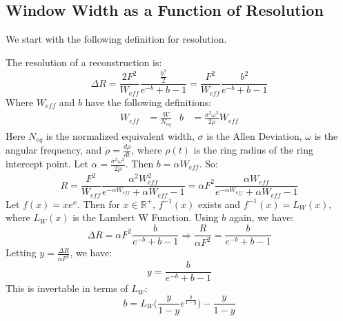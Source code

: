 \documentclass[crop=false,class=book,oneside]{standalone}
\begin{document}
        \subsection{Window Width as a Function of Resolution}
            We start with the following definition for resolution.
            \begin{definition}
            The resolution of a reconstruction is:
            \begin{equation*}
                \Delta R=\frac{2F^{2}}{W_{eff}}\frac{\frac{b^2}{2}}{e^{-b}+b-1}=\frac{F^{2}}{W_{eff}}\frac{b^2}{e^{-b}+b-1}
            \end{equation*}
            Where $W_{eff}$ and $b$ have the following definitions:
            \begin{align*}
                W_{eff}&=\frac{W}{N_{eq}}&b&=\frac{\sigma^2\omega^2}{2\dot{\rho}}W_{eff}
            \end{align*}
            Here $N_{eq}$ is the normalized equivalent width, $\sigma$ is the Allen Deviation, $\omega$ is the angular frequency, and $\dot{\rho}=\frac{d\rho}{dt}$, where $\rho(t)$ is the ring radius of the ring intercept point. Let $\alpha = \frac{\sigma^2 \omega^2}{2\dot{\rho}}$. Then $b = \alpha W_{eff}$. So:
            \begin{equation*}
            R = \frac{F^2}{W_{eff}}\frac{\alpha^2 W_{eff}^2}{e^{-\alpha W_{eff}}+\alpha W_{eff}-1} = \alpha F^2 \frac{\alpha W_{eff}}{e^{-\alpha W_{eff}}+\alpha W_{eff} - 1}
            \end{equation*}
            Let $f(x) = xe^{x}$. Then for $x\in \mathbb{R}^{+}$, $f^{-1}(x)$ exists and $f^{-1}(x) = L_{W}(x)$, where $L_{W}(x)$ is the Lambert W Function. Using $b$ again, we have:
            \begin{equation*}
                \Delta R = \alpha F^2 \frac{b}{e^{-b}+b-1}\Rightarrow \frac{R}{\alpha F^2} = \frac{b}{e^{-b}+b-1}
            \end{equation*}
            Letting $y = \frac{\Delta R}{\alpha F^2}$, we have:
            \begin{equation*}
                y = \frac{b}{e^{-b}+b-1}
            \end{equation*}
            This is invertable in terms of $L_{W}$:
            \begin{equation*}
                b = L_{W}\bigg(\frac{y}{1-y}e^{\frac{y}{1-y}}\bigg) - \frac{y}{1-y}
            \end{equation*}
            \end{definition}
\end{document}
